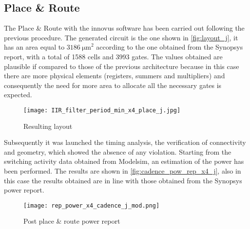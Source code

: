 \subsection{Place \& Route}
The Place \& Route with the innovus software has been carried out following the previous procedure. The generated circuit is the one shown in \autoref{fig:layout_j}, it has an area equal to $\SI{3186}{\micro\meter}^2$ according to the one obtained from the Synopsys report, with a total of 1588 cells and 3993 gates. The values obtained are plausible if compared to those of the previous architecture because in this case there are more physical elements (registers, summers and multipliers) and consequently the need for more area to allocate all the necessary gates is expected.

\begin{figure}[h]
	\center
	\texttt{[image: IIR\_filter\_period\_min\_x4\_place\_j.jpg]}
	\caption{Resulting layout}
	\label{fig:layout_j}
\end{figure}

Subsequently it was launched the timing analysis, the verification of connectivity and geometry, which showed the absence of any violation. Starting from the switching activity data obtained from Modelsim, an estimation of the power has been performed. The results are shown in \autoref{fig:cadence_pow_rep_x4_j}, also in this case the results obtained are in line with those obtained from the Synopsys power report.

\begin{figure}[h]
	\center
	\texttt{[image: rep\_power\_x4\_cadence\_j\_mod.png]}
	\caption{Post place \& route power report}
	\label{fig:cadence_pow_rep_x4_j}
\end{figure}